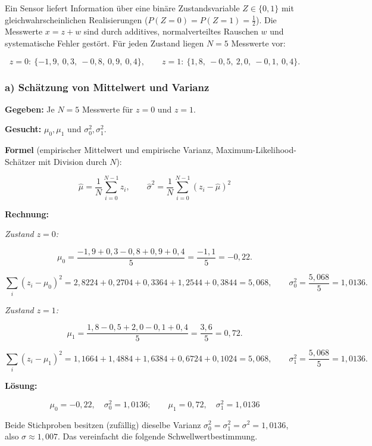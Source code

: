 Ein Sensor liefert Information über eine binäre Zustandsvariable
$Z \in \{0, 1\}$ mit gleichwahrscheinlichen Realisierungen
($P(Z = 0) = P(Z = 1) = \tfrac12$). Die Messwerte $x = z + w$ sind durch
additives, normalverteiltes Rauschen $w$ und systematische Fehler gestört. Für
jeden Zustand liegen $N = 5$ Messwerte vor:

$$
z = 0:\ \{-1{,}9,\ 0{,}3,\ -0{,}8,\ 0{,}9,\ 0{,}4\}, \qquad
z = 1:\ \{1{,}8,\ -0{,}5,\ 2{,}0,\ -0{,}1,\ 0{,}4\}.
$$

\subsubsection*{a) Schätzung von Mittelwert und Varianz}

\begin{beispiel}

\textbf{Gegeben:} Je $N = 5$ Messwerte für $z = 0$ und $z = 1$.

\textbf{Gesucht:} $\mu_0, \mu_1$ und $\sigma_0^2, \sigma_1^2$.

\textbf{Formel} (empirischer Mittelwert und empirische Varianz,
Maximum-Likelihood-Schätzer mit Division durch $N$):

$$
\hat{\mu} = \frac{1}{N} \sum_{i=0}^{N-1} z_i, \qquad
\hat{\sigma}^2 = \frac{1}{N} \sum_{i=0}^{N-1} (z_i - \hat{\mu})^2
$$

\textbf{Rechnung:}

\emph{Zustand $z = 0$:}

$$
\mu_0 = \frac{-1{,}9 + 0{,}3 - 0{,}8 + 0{,}9 + 0{,}4}{5} = \frac{-1{,}1}{5} = -0{,}22.
$$

$$
\sum_i (z_i - \mu_0)^2 = 2{,}8224 + 0{,}2704 + 0{,}3364 + 1{,}2544 + 0{,}3844
= 5{,}068,
\qquad \sigma_0^2 = \frac{5{,}068}{5} = 1{,}0136.
$$

\emph{Zustand $z = 1$:}

$$
\mu_1 = \frac{1{,}8 - 0{,}5 + 2{,}0 - 0{,}1 + 0{,}4}{5} = \frac{3{,}6}{5} = 0{,}72.
$$

$$
\sum_i (z_i - \mu_1)^2 = 1{,}1664 + 1{,}4884 + 1{,}6384 + 0{,}6724 + 0{,}1024
= 5{,}068,
\qquad \sigma_1^2 = \frac{5{,}068}{5} = 1{,}0136.
$$

\textbf{Lösung:}

$$
\boxed{\;\mu_0 = -0{,}22, \quad \sigma_0^2 = 1{,}0136; \qquad
\mu_1 = 0{,}72, \quad \sigma_1^2 = 1{,}0136\;}
$$

Beide Stichproben besitzen (zufällig) dieselbe Varianz
$\sigma_0^2 = \sigma_1^2 = \sigma^2 = 1{,}0136$, also
$\sigma \approx 1{,}007$. Das vereinfacht die folgende Schwellwertbestimmung.

\end{beispiel}

